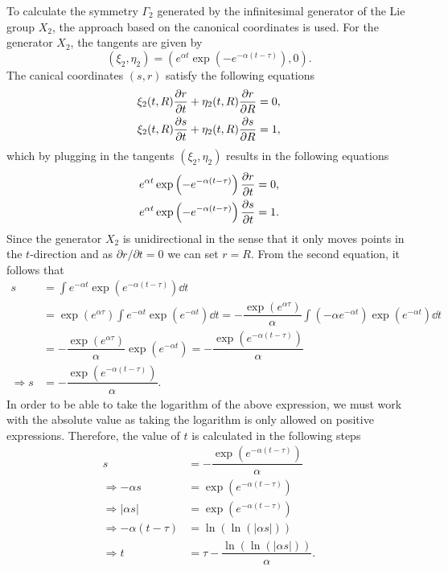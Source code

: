 To calculate the symmetry $\Gamma_2$ generated by the infinitesimal generator of the Lie group $X_2$, the approach based on the canonical coordinates is used. For the generator $X_2$, the tangents are given by
$$\left(\xi_2,\eta_2\right)=\left(e^{\alpha t}\exp\left(-e^{-\alpha(t-\tau)}\right),0\right).$$
The canical coordinates $(s,r)$ satisfy the following equations 
\begin{align*}
\xi_{2}(t,R)\pdv{r}{t}+\eta_{2}(t,R)\pdv{r}{R}&=0,\\
\xi_{2}(t,R)\pdv{s}{t}+\eta_{2}(t,R)\pdv{s}{R}&=1,\\
\end{align*}
which by plugging in the tangents $\left(\xi_2,\eta_2\right)$ results in the following equations
\begin{align*}
e^{\alpha t}\exp\left(-e^{-\alpha(t-\tau)}\right)\pdv{r}{t}&=0,\\
e^{\alpha t}\exp\left(-e^{-\alpha(t-\tau)}\right)\pdv{s}{t}&=1.\\
\end{align*}
Since the generator $X_2$ is unidirectional in the sense that it only moves points in the $t$-direction and as $\partial r/\partial t=0$ we can set $r=R$. From the second equation, it follows that
\begin{align*}
  s&=\int e^{-\alpha t}\exp\left(e^{-\alpha(t-\tau)}\right)\dd t\\
   &=\exp\left(e^{\alpha\tau}\right)\int e^{-\alpha t}\exp\left(e^{-\alpha t}\right)\dd t=-\dfrac{\exp\left(e^{\alpha\tau}\right)}{\alpha}\int \left(-\alpha e^{-\alpha t}\right)\exp\left(e^{-\alpha t}\right)\dd t\\
   &=-\dfrac{\exp\left(e^{\alpha\tau}\right)}{\alpha}\exp\left(e^{-\alpha t}\right)=-\dfrac{\exp\left(e^{-\alpha (t-\tau)}\right)}{\alpha}\\
  \Longrightarrow s&= -\dfrac{\exp\left(e^{-\alpha (t-\tau)}\right)}{\alpha}.  
\end{align*}
In order to be able to take the logarithm of the above expression, we must work with the absolute value as taking the logarithm is only allowed on positive expressions. Therefore, the value of $t$ is calculated in the following steps
\begin{align*}
  s&= -\dfrac{\exp\left(e^{-\alpha (t-\tau)}\right)}{\alpha}\\
  \Longrightarrow -\alpha s&=\exp\left(e^{-\alpha (t-\tau)}\right)\\
  \Longrightarrow |\alpha s|&=\exp\left(e^{-\alpha (t-\tau)}\right)\\
  \Longrightarrow -\alpha (t-\tau)&=\ln\left(\ln\left(|\alpha s|\right)\right)\\
  \Longrightarrow t&=\tau-\dfrac{\ln\left(\ln\left(|\alpha s|\right)\right)}{\alpha}. 
\end{align*}
